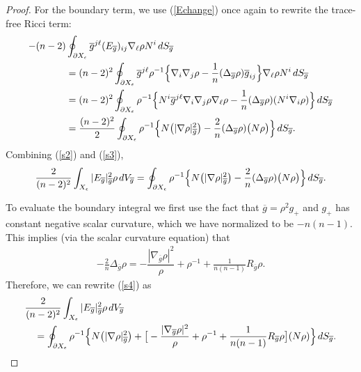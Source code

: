 \documentclass{amsart}
\newcommand{\hs}{\hskip.02in}
\theoremstyle{definition}
\theoremstyle{remark}
\numberwithin{equation}{section}
\begin{document}
\begin{proof}
For the boundary term, we use (\ref{Echange}) once again to rewrite the trace-free Ricci term:
\begin{align} \label{s3} \begin{split}
- (n-2)& \oint_{\partial X_{\epsilon}}\overline{g}^{j \ell}  ( E_{\overline{g}} )_{ij} \nabla_{\ell} \rho  N^i \hs dS_{\overline{g}} \\
&= (n-2)^2 \oint_{\partial X_{\epsilon}}\overline{g}^{j \ell} \rho^{-1} \Big\{ \nabla_i \nabla_j \rho - \frac{1}{n}  ( \Delta_{\overline{g}} \rho) \overline{g}_{ij} \Big\} \nabla_{\ell} \rho  N^i \hs dS_{\overline{g}} \\
&= (n-2)^2 \oint_{\partial X_{\epsilon}} \rho^{-1} \Big\{ N^i \overline{g}^{j \ell}   \nabla_i \nabla_j \rho \nabla_{\ell} \rho - \frac{1}{n}  ( \Delta_{\overline{g}} \rho) (N^i \nabla_i \rho)  \Big\} \hs   dS_{\overline{g}} \\
&= \frac{(n-2)^2}{2} \oint_{\partial X_{\epsilon}} \rho^{-1} \Big\{  N \big( |\nabla \rho|^2_{\overline{g}} \big) - \frac{2}{n} ( \Delta_{\overline{g}} \rho) \big( N \rho \big)  \Big\} \hs   dS_{\overline{g}}.
\end{split}
\end{align}
Combining (\ref{s2}) and (\ref{s3}),
\begin{align} \label{s4}
\frac{2}{(n-2)^2} \int_{X_{\epsilon}} | E_{\overline{g}}|^2_{\overline{g}} \rho\hs dV_{\overline{g}} =  \oint_{\partial X_{\epsilon}} \rho^{-1} \Big\{ N \big( |\nabla \rho|^2_{\overline{g}} \big) - \frac{2}{n} ( \Delta_{\overline{g}} \rho) \big( N \rho \big)  \Big\} \hs   dS_{\overline{g}}.
\end{align}

To evaluate the boundary integral we first use the fact that $\overline{g} = \rho^2 g_{+}$ and $g_{+}$ has constant negative scalar curvature, which we have normalized to be $-n(n-1)$.  This implies (via the scalar curvature equation) that
\begin{align*} %
- \frac{2}{n} \Delta_{\overline{g}} \rho = - \dfrac{|\nabla_{\overline{g}} \rho|^2}{\rho} + \rho^{-1} + \frac{1}{n(n-1)}R_{\overline{g}} \rho.
\end{align*}
Therefore, we can rewrite (\ref{s4}) as
\begin{align} \label{s5} \begin{split}
&\frac{2}{(n-2)^2}  \int_{X_{\epsilon}}  | E_{\overline{g}}|^2_{\overline{g}} \rho\hs dV_{\overline{g}} \\
&\quad= \oint_{\partial X_{\epsilon}} \rho^{-1} \Big\{ N \big( |\nabla \rho|^2_{\overline{g}} \big) +    \big[ - \dfrac{|\nabla_{\overline{g}} \rho|^2}{\rho} + \rho^{-1} + \frac{1}{n(n-1)}R_{\overline{g}} \rho \big]( N \rho ) \Big\} \hs   dS_{\overline{g}}.
\end{split}
\end{align}


\end{proof}
\end{document}
